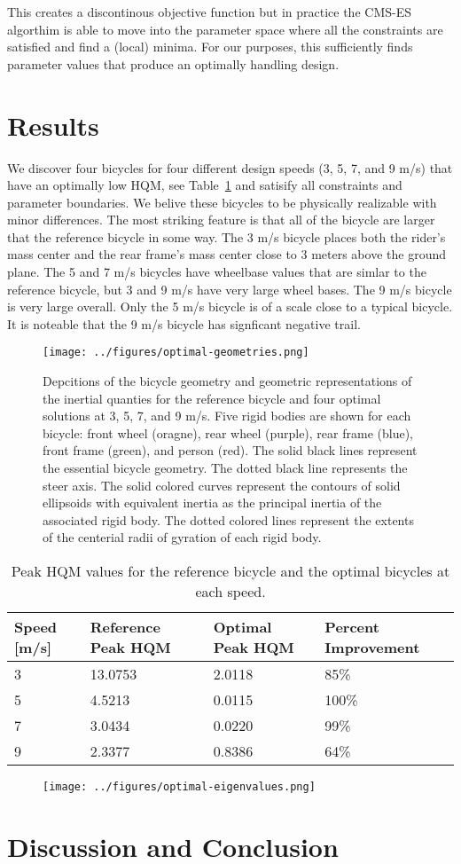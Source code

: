 \documentclass{bmd2019a}
\begin{document}
This creates a discontinous objective function but in practice the CMS-ES
algorthim is able to move into the parameter space where all the constraints
are satisfied and find a (local) minima. For our purposes, this sufficiently
finds parameter values that produce an optimally handling design.

\section{Results}
%
We discover four bicycles for four different design speeds (3, 5, 7, and 9 m/s)
that have an optimally low HQM, see Table~\ref{tab:hqm} and satisify all
constraints and parameter boundaries. We belive these bicycles to be physically
realizable with minor differences. The most striking feature is that all of the
bicycle are larger that the reference bicycle in some way.  The 3 m/s bicycle
places both the rider's mass center and the rear frame's mass center close to 3
meters above the ground plane. The 5 and 7 m/s bicycles have wheelbase values
that are simlar to the reference bicycle, but 3 and 9 m/s have very large wheel
bases. The 9 m/s bicycle is very large overall. Only the 5 m/s bicycle is of a
scale close to a typical bicycle. It is noteable that the 9 m/s bicycle has
signficant negative trail.
%
\begin{figure}
  \centering
  \texttt{[image: ../figures/optimal-geometries.png]}
  \caption{Depcitions of the bicycle geometry and geometric representations of
    the inertial quanties for the reference bicycle and four optimal solutions
    at 3, 5, 7, and 9 m/s. Five rigid bodies are shown for each bicycle: front
    wheel (oragne), rear wheel (purple), rear frame (blue), front frame
    (green), and person (red). The solid black lines represent the essential
    bicycle geometry. The dotted black line represents the steer axis. The
    solid colored curves represent the contours of solid ellipsoids with
    equivalent inertia as the principal inertia of the associated rigid body.
    The dotted colored lines represent the extents of the centerial radii of
    gyration of each rigid body.}
\end{figure}
%
\begin{table}
  \caption{Peak HQM values for the reference bicycle and the optimal bicycles
    at each speed.}
  \label{tab:hqm}
  \centering
  \begin{tabular}{llll}
    \toprule
    Speed [m/s] & Reference Peak HQM & Optimal Peak HQM & Percent Improvement \\
    \midrule
    3 & 13.0753 & 2.0118 & 85\% \\
    5 & 4.5213  & 0.0115 & 100\% \\
    7 & 3.0434  & 0.0220 &  99\% \\
    9 & 2.3377  & 0.8386 &  64\% \\
    \bottomrule
  \end{tabular}
\end{table}
%
\begin{figure}
  \centering
  \texttt{[image: ../figures/optimal-eigenvalues.png]}
  \caption{}
\end{figure}

\section{Discussion and Conclusion}
%



\end{document}
